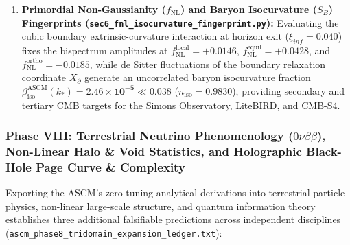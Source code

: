 \documentclass[aps,prd,onecolumn,superscriptaddress,nofootinbib,longbibliography,10pt]{revtex4-2}
\begin{document}
\begin{enumerate}
\item \textbf{Primordial Non-Gaussianity (\(f_{\mathrm{NL}}\)) and Baryon Isocurvature (\(S_B\)) Fingerprints (\texttt{sec6_fnl_isocurvature_fingerprint.py}):} Evaluating the cubic boundary extrinsic-curvature interaction at horizon exit (\(\xi_{inf} = 0.040\)) fixes the bispectrum amplitudes at \(f_{\mathrm{NL}}^{\mathrm{local}} = \mathbf{+0.0146}\), \(f_{\mathrm{NL}}^{\mathrm{equil}} = \mathbf{+0.0428}\), and \(f_{\mathrm{NL}}^{\mathrm{ortho}} = \mathbf{-0.0185}\), while de Sitter fluctuations of the boundary relaxation coordinate \(X_{\partial}\) generate an uncorrelated baryon isocurvature fraction \(\beta_{\mathrm{iso}}^{\mathrm{ASCM}}(k_*) = \mathbf{2.46 \times 10^{-5}} \ll 0.038\) (\(n_{\mathrm{iso}} = 0.9830\)), providing secondary and tertiary CMB targets for the Simons Observatory, LiteBIRD, and CMB-S4.

\end{enumerate}




\subsubsection*{Phase VIII: Terrestrial Neutrino Phenomenology (\(0\nu\beta\beta\)), Non-Linear Halo \& Void Statistics, and Holographic Black-Hole Page Curve \& Complexity}

Exporting the ASCM's zero-tuning analytical derivations into terrestrial particle physics, non-linear large-scale structure, and quantum information theory establishes three additional falsifiable predictions across independent disciplines (\texttt{ascm_phase8_tridomain_expansion_ledger.txt}):
\end{document}

